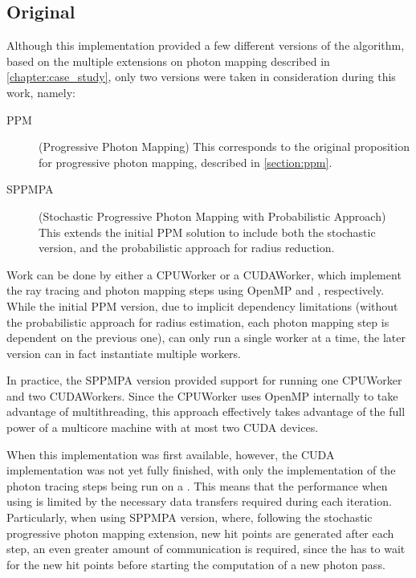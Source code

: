 \documentclass[main.tex]{subfiles}
\begin{document}
\subsection{Original} \label{section:impl_original}

Although this implementation provided a few different versions of the algorithm, based on the multiple extensions on photon mapping described in \cref{chapter:case_study}, only two versions were taken in consideration during this work, namely:

\begin{description}
\item[PPM] (Progressive Photon Mapping) This corresponds to the original proposition for progressive photon mapping, described in \cref{section:ppm}.

\item[SPPMPA] (Stochastic Progressive Photon Mapping with Probabilistic Approach) This extends the initial PPM solution to include both the stochastic version, and the probabilistic approach for radius reduction.
\end{description}

Work can be done by either a CPUWorker or a CUDAWorker, which implement the ray tracing and photon mapping steps using \acs{OpenMP} and \cuda, respectively. While the initial PPM version, due to implicit dependency limitations (without the probabilistic approach for radius estimation, each photon mapping step is dependent on the previous one), can only run a single worker at a time, the later version can in fact instantiate multiple workers.

In practice, the SPPMPA version provided support for running one CPUWorker and two CUDAWorkers. Since the CPUWorker uses \acs{OpenMP} internally to take advantage of multithreading, this approach effectively takes advantage of the full power of a multicore machine with at most two \acs{CUDA} devices.

When this implementation was first available, however, the \acs{CUDA} implementation was not yet fully finished, with only the implementation of the photon tracing steps being run on a \gpu. This means that the performance when using \cuda is limited by the necessary data transfers required during each iteration. Particularly, when using SPPMPA version, where, following the stochastic progressive photon mapping extension, new hit points are generated after each step, an even greater amount of communication is required, since the \gpu has to wait for the new hit points before starting the computation of a new photon pass.


\end{document}
